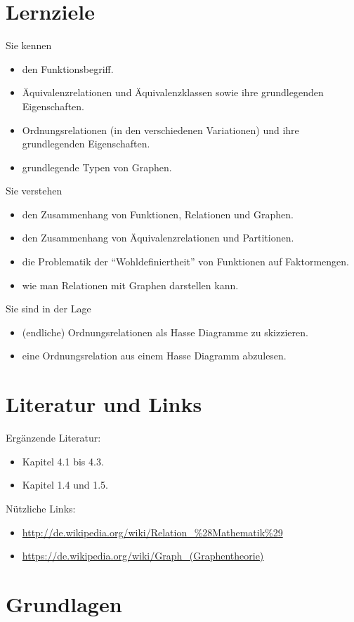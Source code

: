 \section*{Lernziele}
Sie kennen
\begin{itemize}
\item den Funktionsbegriff.
\item Äquivalenzrelationen und Äquivalenzklassen sowie ihre grundlegenden Eigenschaften.
\item Ordnungsrelationen (in den verschiedenen Variationen) und ihre grundlegenden
Eigenschaften.
\item grundlegende Typen von Graphen.
\end{itemize}
Sie verstehen
\begin{itemize}
\item den Zusammenhang von Funktionen, Relationen und Graphen.
\item den Zusammenhang von Äquivalenzrelationen und Partitionen.
\item die Problematik der ``Wohldefiniertheit'' von Funktionen auf Faktormengen.
\item wie man Relationen mit Graphen darstellen kann.
\end{itemize}
Sie sind in der Lage
\begin{itemize}
\item (endliche) Ordnungsrelationen als Hasse Diagramme zu skizzieren.
\item eine Ordnungsrelation aus einem Hasse Diagramm abzulesen.
\end{itemize}


\section*{Literatur und Links}
Ergänzende Literatur:
\begin{itemize}
\item \cite{diskreteStrukturen} Kapitel 4.1 bis 4.3.
\item \cite{pareigis} Kapitel 1.4 und 1.5.
\end{itemize}
Nützliche Links:
\begin{itemize}
\item \url{http://de.wikipedia.org/wiki/Relation_%28Mathematik%29}
\item \url{https://de.wikipedia.org/wiki/Graph_(Graphentheorie)}
\end{itemize}


\section{Grundlagen}

